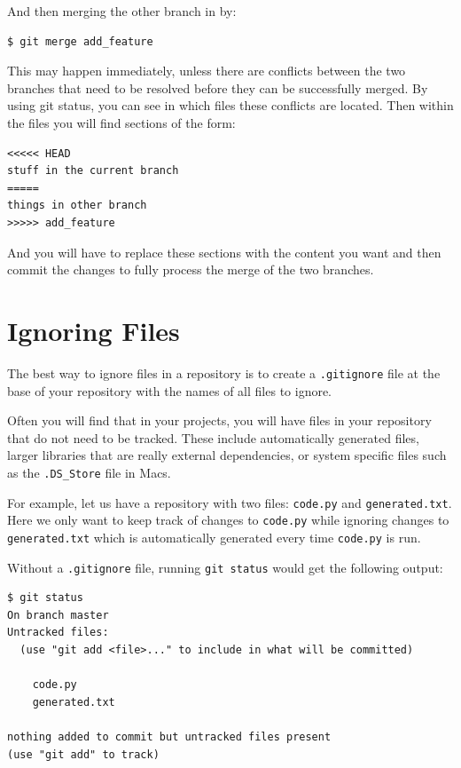 \documentclass[12pt]{report}
\renewcommand\section[1]{{\chapter{#1}}}
\begin{document}
And then merging the other branch in by:

\begin{verbatim}
$ git merge add_feature
\end{verbatim}  
This may happen immediately, unless there are conflicts between the two branches that need to be resolved before they can be successfully merged.  By using git status, you can see in which files these conflicts are located.  Then within the files you will find sections of the form:

\begin{verbatim}
<<<<< HEAD
stuff in the current branch
=====
things in other branch
>>>>> add_feature
\end{verbatim}  

And you will have to replace these sections with the content you want and then commit the changes to fully process the merge of the two branches.

\section{Ignoring Files}

The best way to ignore files in a repository is to create a \texttt{.gitignore} file at the base of your repository with the names of all files to ignore.

Often you will find that in your projects, you will have files in your repository that do not need to be tracked.  These include automatically generated files, larger libraries that are really external dependencies, or system specific files such as the \texttt{.DS\_Store} file in Macs.

For example, let us have a repository with two files: \texttt{code.py} and \texttt{generated.txt}.  Here we only want to keep track of changes to \texttt{code.py} while ignoring changes to \texttt{generated.txt} which is automatically generated every time \texttt{code.py} is run.

Without a \texttt{.gitignore} file, running \texttt{git status} would get the following output:

\begin{verbatim}
$ git status
On branch master
Untracked files:
  (use "git add <file>..." to include in what will be committed)
  
    code.py
    generated.txt

nothing added to commit but untracked files present
(use "git add" to track)
\end{verbatim}
\end{document}
